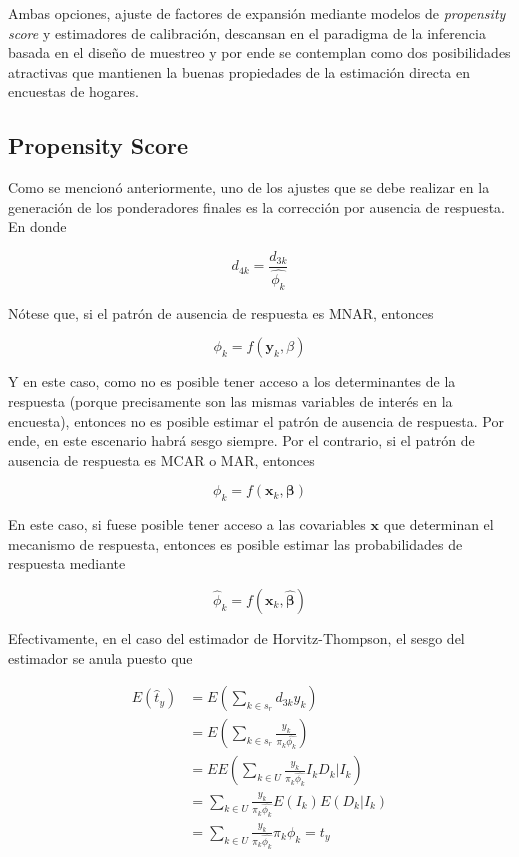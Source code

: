 \documentclass[
  10pt,
  spanish,
]{book}
\begin{document}
Ambas opciones, ajuste de factores de expansión mediante modelos de \emph{propensity score} y estimadores de calibración, descansan en el paradigma de la inferencia basada en el diseño de muestreo y por ende se contemplan como dos posibilidades atractivas que mantienen la buenas propiedades de la estimación directa en encuestas de hogares.

\hypertarget{propensity-score}{%
\subsection{Propensity Score}\label{propensity-score}}

Como se mencionó anteriormente, uno de los ajustes que se debe realizar en la generación de los ponderadores finales es la corrección por ausencia de respuesta. En donde

\[d_{4k} =  \frac{d_{3k}}{\hat{\phi_k}}\]

Nótese que, si el patrón de ausencia de respuesta es MNAR, entonces

\[
\phi_k = f(\mathbf{y}_k, \beta)
\]

Y en este caso, como no es posible tener acceso a los determinantes de la respuesta (porque precisamente son las mismas variables de interés en la encuesta), entonces no es posible estimar el patrón de ausencia de respuesta. Por ende, en este escenario habrá sesgo siempre. Por el contrario, si el patrón de ausencia de respuesta es MCAR o MAR, entonces

\[
\phi_k = f(\mathbf{x}_k, \boldsymbol{\beta})
\]

En este caso, si fuese posible tener acceso a las covariables \(\mathbf{x}\) que determinan el mecanismo de respuesta, entonces es posible estimar las probabilidades de respuesta mediante

\[
\hat{\phi}_k = f(\mathbf{x}_k, \hat{\boldsymbol{\beta}})
\]

Efectivamente, en el caso del estimador de Horvitz-Thompson, el sesgo del estimador se anula puesto que

\begin{align*}
E(\hat{t}_y) &= E\left(\sum_{k\in s_r}d_{3k}y_k\right) \\
&= E\left(\sum_{k\in s_r}\frac{y_k}{\pi_k \hat{\phi_k}}\right)\\
&= EE\left(\sum_{k\in U}\frac{y_k}{\pi_k \hat{\phi_k}}I_kD_k|I_k\right)\\
&= \sum_{k\in U}\frac{y_k}{\pi_k \hat{\phi_k}}E\left(I_k\right)E\left(D_k|I_k\right)\\
&= \sum_{k\in U}\frac{y_k}{\pi_k \hat{\phi_k}}\pi_k\phi_k = t_y
\end{align*}
\end{document}
